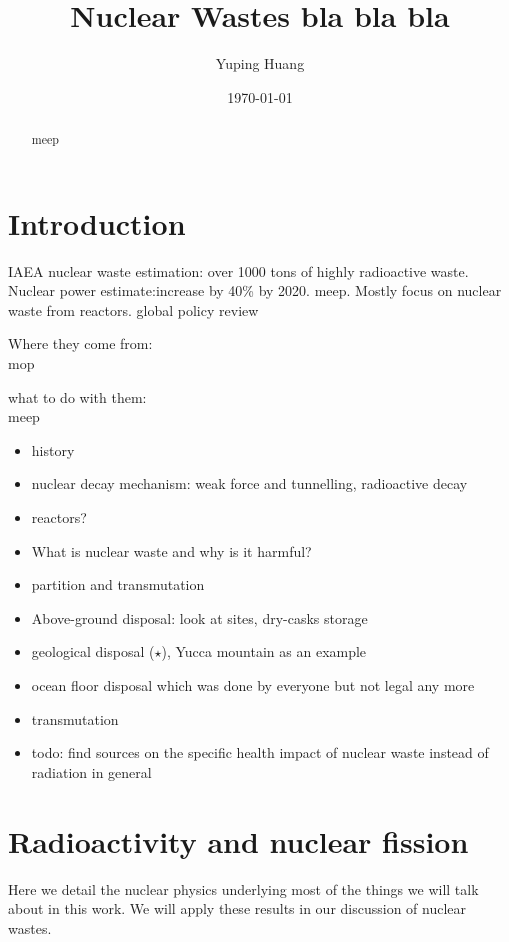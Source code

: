 \documentclass[preprint,aip,pra]{revtex4-1}
\begin{document}
\title{Nuclear Wastes bla bla bla}

\author{Yuping Huang}%

\date{\today}%
\begin{abstract}
    meep
\end{abstract}
\maketitle

\tableofcontents
\newpage

\section{Introduction}
IAEA nuclear waste estimation: over 1000 tons of highly radioactive waste.\cite{iaea08}
Nuclear power estimate:increase by 40\% by 2020. \cite{iaea12}
meep. Mostly focus on nuclear waste from reactors.
global policy review \cite{r12} 

Where they come from:\\
mop

what to do with them:\\
meep

\begin{itemize}
    \item history
    \item nuclear decay mechanism: weak force and tunnelling, radioactive decay
    \item reactors?
    \item What is nuclear waste and why is it harmful?
    \item partition and transmutation
    \item Above-ground disposal: look at sites, dry-casks storage
    \item geological disposal ($\star$), Yucca mountain as an example
    \item ocean floor disposal which was done by everyone but not legal any more
    \item transmutation
    \item todo: find sources on the specific health impact of nuclear waste instead of radiation
        in general
\end{itemize}

\section{Radioactivity and nuclear fission}
    Here we detail the nuclear physics underlying most of the things we will talk about
    in this work. We will apply these results in our discussion of nuclear wastes.
\end{document}
